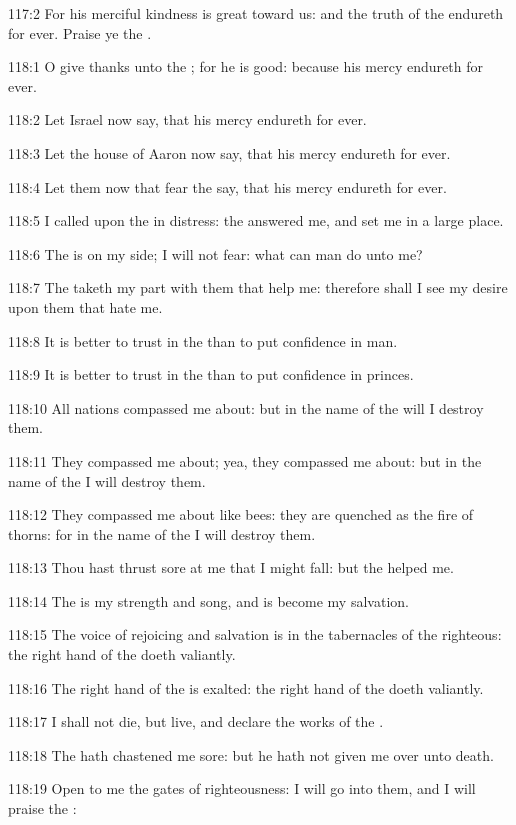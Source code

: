 117:2 For his merciful kindness is great toward us: and the truth of the \LORD endureth for ever. Praise ye the \LORD.



118:1 O give thanks unto the \LORD; for he is good: because his mercy endureth for ever.

118:2 Let Israel now say, that his mercy endureth for ever.

118:3 Let the house of Aaron now say, that his mercy endureth for ever.

118:4 Let them now that fear the \LORD say, that his mercy endureth for ever.

118:5 I called upon the \LORD in distress: the \LORD answered me, and set me in a large place.

118:6 The \LORD is on my side; I will not fear: what can man do unto me?

118:7 The \LORD taketh my part with them that help me: therefore shall I see my desire upon them that hate me.

118:8 It is better to trust in the \LORD than to put confidence in man.

118:9 It is better to trust in the \LORD than to put confidence in princes.

118:10 All nations compassed me about: but in the name of the \LORD will I destroy them.

118:11 They compassed me about; yea, they compassed me about: but in the name of the \LORD I will destroy them.

118:12 They compassed me about like bees: they are quenched as the fire of thorns: for in the name of the \LORD I will destroy them.

118:13 Thou hast thrust sore at me that I might fall: but the \LORD helped me.

118:14 The \LORD is my strength and song, and is become my salvation.

118:15 The voice of rejoicing and salvation is in the tabernacles of the righteous: the right hand of the \LORD doeth valiantly.

118:16 The right hand of the \LORD is exalted: the right hand of the \LORD doeth valiantly.

118:17 I shall not die, but live, and declare the works of the \LORD.

118:18 The \LORD hath chastened me sore: but he hath not given me over unto death.

118:19 Open to me the gates of righteousness: I will go into them, and I will praise the \LORD:

